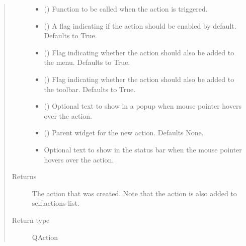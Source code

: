 \documentclass[letterpaper,10pt,english]{sphinxmanual}
\begin{document}
\begin{fulllineitems}
\begin{fulllineitems}
\begin{quote}
\begin{description}
\begin{itemize}
\item {} 
 () \textendash{} Function to be called when the action is triggered.

\item {} 
 () \textendash{} A flag indicating if the action should be enabled
by default. Defaults to True.

\item {} 
 () \textendash{} Flag indicating whether the action should also
be added to the menu. Defaults to True.

\item {} 
 () \textendash{} Flag indicating whether the action should also
be added to the toolbar. Defaults to True.

\item {} 
 () \textendash{} Optional text to show in a popup when mouse pointer
hovers over the action.

\item {} 
 () \textendash{} Parent widget for the new action. Defaults None.

\item {} 
 \textendash{} Optional text to show in the status bar when the
mouse pointer hovers over the action.

\end{itemize}

\item[{Returns}] \leavevmode
The action that was created. Note that the action is also
added to self.actions list.

\item[{Return type}] \leavevmode
QAction

\end{description}\end{quote}

\end{fulllineitems}


\end{fulllineitems}
\end{document}
